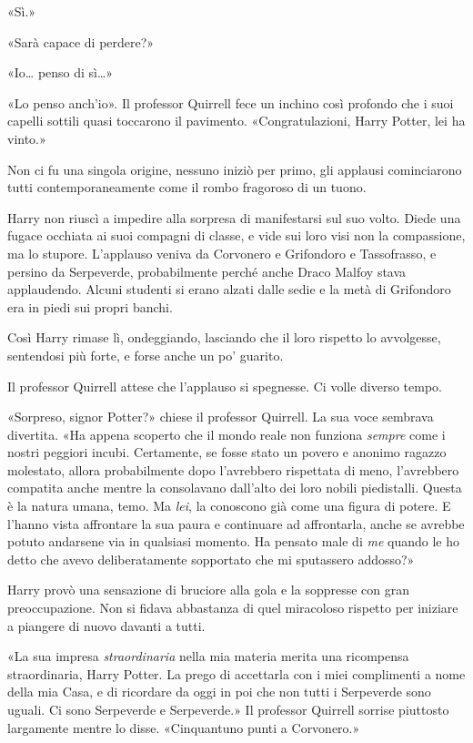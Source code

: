 «Sì.»

«Sarà capace di perdere?»

«Io… penso di sì…»

«Lo penso anch’io». Il professor Quirrell fece un inchino così profondo che i suoi capelli sottili quasi toccarono il pavimento. «Congratulazioni, Harry Potter, lei ha vinto.»

Non ci fu una singola origine, nessuno iniziò per primo, gli applausi cominciarono tutti contemporaneamente come il rombo fragoroso di un tuono.

Harry non riuscì a impedire alla sorpresa di manifestarsi sul suo volto. Diede una fugace occhiata ai suoi compagni di classe, e vide sui loro visi non la compassione, ma lo stupore. L’applauso veniva da Corvonero e Grifondoro e Tassofrasso, e persino da Serpeverde, probabilmente perché anche Draco Malfoy stava applaudendo. Alcuni studenti si erano alzati dalle sedie e la metà di Grifondoro era in piedi sui propri banchi.

Così Harry rimase lì, ondeggiando, lasciando che il loro rispetto lo avvolgesse, sentendosi più forte, e forse anche un po’ guarito.

Il professor Quirrell attese che l’applauso si spegnesse. Ci volle diverso tempo.

«Sorpreso, signor Potter?» chiese il professor Quirrell. La sua voce sembrava divertita. «Ha appena scoperto che il mondo reale non funziona \textit{sempre} come i nostri peggiori incubi. Certamente, se fosse stato un povero e anonimo ragazzo molestato, allora probabilmente dopo l’avrebbero rispettata di meno, l’avrebbero compatita anche mentre la consolavano dall’alto dei loro nobili piedistalli. Questa è la natura umana, temo. Ma \textit{lei}, la conoscono già come una figura di potere. E l’hanno vista affrontare la sua paura e continuare ad affrontarla, anche se avrebbe potuto andarsene via in qualsiasi momento. Ha pensato male di \textit{me} quando le ho detto che avevo deliberatamente sopportato che mi sputassero addosso?»

Harry provò una sensazione di bruciore alla gola e la soppresse con gran preoccupazione. Non si fidava abbastanza di quel miracoloso rispetto per iniziare a piangere di nuovo davanti a tutti.

«La sua impresa \textit{straordinaria} nella mia materia merita una ricompensa straordinaria, Harry Potter. La prego di accettarla con i miei complimenti a nome della mia Casa, e di ricordare da oggi in poi che non tutti i Serpeverde sono uguali. Ci sono Serpeverde e Serpeverde.» Il professor Quirrell sorrise piuttosto largamente mentre lo disse. «Cinquantuno punti a Corvonero.»

